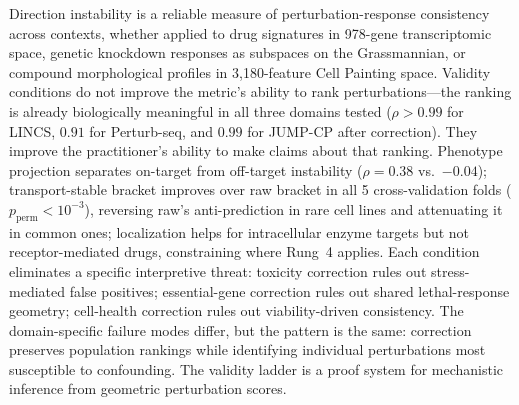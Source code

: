 \documentclass{article}
\begin{document}
Direction instability is a reliable measure of perturbation-response
consistency across contexts, whether applied to drug signatures in 978-gene
transcriptomic space, genetic knockdown responses as subspaces on the
Grassmannian, or compound morphological profiles in 3{,}180-feature Cell
Painting space. Validity conditions do not improve the metric's ability to
rank perturbations---the ranking is already biologically meaningful in all
three domains tested ($\rho > 0.99$ for LINCS, $0.91$ for Perturb-seq,
and $0.99$ for JUMP-CP after correction).
They improve the practitioner's ability to make claims about that ranking.
Phenotype projection separates on-target from off-target instability
($\rho = 0.38$ vs.\ $-0.04$); transport-stable bracket improves over raw bracket in all 5
cross-validation folds ($p_{\text{perm}} < 10^{-3}$), reversing raw's
anti-prediction in rare cell lines and attenuating it in common ones;
localization
helps for intracellular enzyme targets but not receptor-mediated drugs,
constraining where Rung~4 applies. Each condition eliminates a specific
interpretive threat: toxicity correction rules out stress-mediated false
positives; essential-gene correction rules out shared lethal-response
geometry; cell-health correction rules out viability-driven consistency.
The domain-specific failure modes differ, but the pattern is the same:
correction preserves population rankings while identifying individual
perturbations most susceptible to confounding. The validity ladder is a
proof system for mechanistic inference from geometric perturbation scores.



\end{document}
